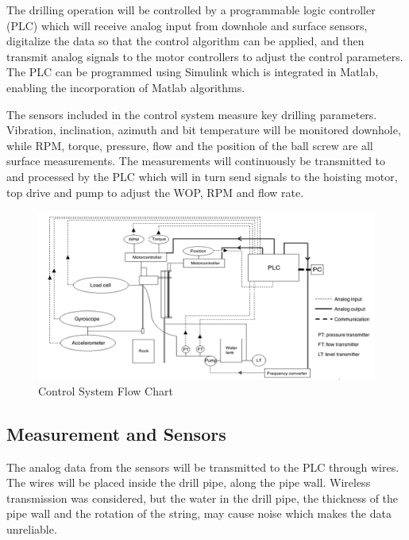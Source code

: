 The drilling operation will be controlled by a programmable logic controller (PLC) which will receive analog input from downhole and surface sensors, digitalize the data so that the control algorithm can be applied, and then transmit analog signals to the motor controllers to adjust the control parameters. The PLC can be programmed using Simulink which is integrated in Matlab, enabling the incorporation of Matlab algorithms. 


The sensors included in the control system measure key drilling parameters. Vibration, inclination, azimuth and bit temperature will be monitored downhole, while RPM, torque, pressure, flow and the position of the ball screw are all surface measurements. The measurements will continuously be transmitted to and processed by the PLC which will in turn send signals to the hoisting motor, top drive and pump to adjust the WOP, RPM and flow rate.

\begin{figure} [H]
\centering
\includegraphics[width=1.0\textwidth]{figures/controlsystemflc.png}
\caption{Control System Flow Chart}
\label{fig:controlsystemflc}
\end{figure}

\subsection{Measurement and Sensors}

The analog data from the sensors will be transmitted to the PLC through wires. The wires will be placed inside the drill pipe, along the pipe wall. Wireless transmission was considered, but the water in the drill pipe, the thickness of the pipe wall and the rotation of the string, may cause noise which makes the data unreliable. 

